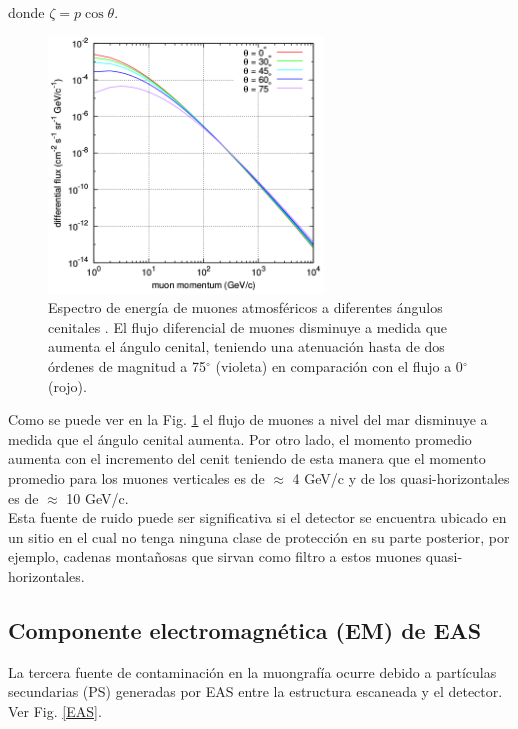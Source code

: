 donde $\zeta=p\cos\theta$.

\begin{figure}[h!]
\begin{center}
\includegraphics[width=0.65\textwidth]{Figures/Muon_spectrum.png}
\caption[Espectro de energía de muones atmosféricos a diferentes ángulos cenitales]{Espectro de energía de muones atmosféricos a diferentes ángulos cenitales \cite{Ariga2018, Vesga2018, Valencia2016}. El flujo diferencial de muones disminuye a medida que aumenta el ángulo cenital, teniendo una atenuación hasta de dos órdenes de magnitud a 75$^\circ$ (violeta) en comparación con el flujo a 0$^\circ$ (rojo).}
\label{Muon_spectrum}
\end{center}
\end{figure}

Como se puede ver en la Fig. \ref{Muon_spectrum} el flujo de muones a nivel del mar disminuye a medida que el ángulo cenital aumenta. Por otro lado, el momento promedio aumenta con el incremento del cenit teniendo de esta manera que el momento promedio para los muones verticales es de $\approx$ 4 GeV/c y de los quasi-horizontales es de $\approx$ 10 GeV/c.\\

Esta fuente de ruido puede ser significativa si el detector se encuentra ubicado en un sitio en el cual no tenga ninguna clase de protección en su parte posterior, por ejemplo, cadenas montañosas que sirvan como filtro a estos muones quasi-horizontales.

\subsection{Componente electromagnética (EM) de EAS}

La tercera fuente de contaminación en la muongrafía ocurre debido a partículas secundarias (PS) generadas por EAS entre la estructura escaneada y el detector. Ver Fig. \ref{EAS}.\\

